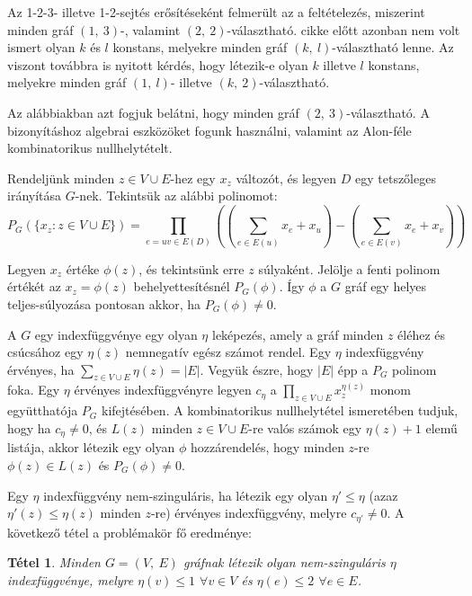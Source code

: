 \documentclass[12pt, a4paper]{report}
\newtheorem{tét}{Tétel}[section]
\theoremstyle{remark}
\theoremstyle{definition}
\begin{document}
Az 1-2-3- illetve 1-2-sejtés erősítéseként felmerült az a feltételezés, miszerint minden gráf $(1,\ 3)$-, valamint $(2,\ 2)$-választható. \citeauthor{Wong2014} cikke előtt azonban nem volt ismert olyan $k$ és $l$ konstans, melyekre minden gráf $(k,\ l)$-választható lenne. Az viszont továbbra is nyitott kérdés, hogy létezik-e olyan $k$ illetve $l$ konstans, melyekre minden gráf $(1,\ l)$- illetve $(k,\ 2)$-választható.

Az alábbiakban azt fogjuk belátni, hogy minden gráf $(2,\ 3)$-választható. A bizonyításhoz algebrai eszközöket fogunk használni, valamint az Alon-féle kombinatorikus nullhelytételt.

Rendeljünk minden $z \in V \cup E$-hez egy $x_z$ változót, és legyen $D$ egy tetszőleges irányítása $G$-nek. Tekintsük az alábbi polinomot:
\begin{equation}
P_G(\lbrace x_z: z \in V \cup E \rbrace) = \prod_{e = uv \in E(D)} \left( \left( \sum_{e \in E(u)} x_e + x_u \right) - \left( \sum_{e \in E(v)} x_e + x_v \right) \right)
\end{equation}

Legyen $x_z$ értéke $\phi(z)$, és tekintsünk erre $z$ súlyaként. Jelölje a fenti polinom értékét az $x_z = \phi(z)$ behelyettesítésnél $P_G(\phi)$. Így $\phi$ a $G$ gráf egy helyes teljes-súlyozása pontosan akkor, ha $P_G(\phi) \neq 0$.

A $G$ egy indexfüggvénye egy olyan $\eta$ leképezés, amely a gráf minden $z$ éléhez és csúcsához egy $\eta(z)$ nemnegatív egész számot rendel. Egy $\eta$ indexfüggvény érvényes, ha $\sum\limits_{z \in V \cup E} \eta(z) = |E|$. Vegyük észre, hogy $|E|$ épp a $P_G$ polinom foka. Egy $\eta$ érvényes indexfüggvényre legyen $c_\eta$ a $\prod\limits_{z \in V \cup E} x_z^{\eta(z)} $ monom együtthatója $P_G$ kifejtésében. A kombinatorikus nullhelytétel ismeretében tudjuk, hogy ha $c_\eta \neq 0$, és $L(z)$ minden $z \in V \cup E$-re valós számok egy $\eta(z) + 1$ elemű listája, akkor létezik egy olyan $\phi$ hozzárendelés, hogy minden $z$-re $\phi(z) \in L(z)$ és $P_G(\phi) \neq 0$.

Egy $\eta$ indexfüggvény nem-szinguláris, ha létezik egy olyan $\eta' \leq \eta$ (azaz $\eta'(z) \leq \eta(z)$ minden $z$-re) érvényes indexfüggvény, melyre $c_{\eta'} \neq 0$. A következő tétel a problémakör fő eredménye:

\begin{tét}
Minden $G = (V,\ E)$ gráfnak létezik olyan nem-szinguláris $\eta$ indexfüggvénye, melyre $\eta(v) \leq 1$ $\forall v \in V$ és $\eta(e) \leq 2$ $\forall e \in E$.
\end{tét}
\end{document}
